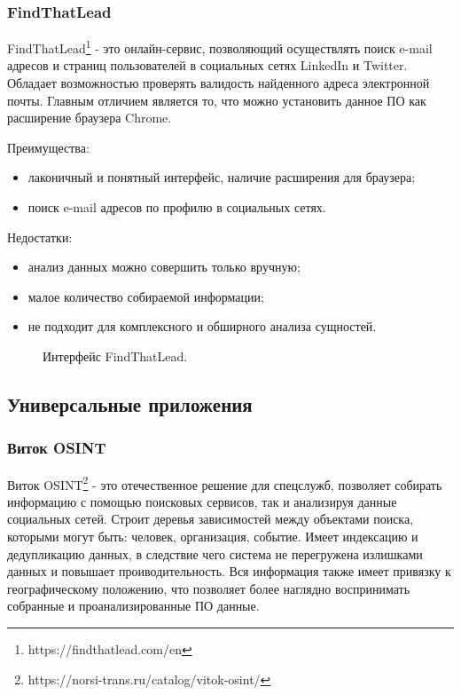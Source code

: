 \subsubsection{FindThatLead}
FindThatLead\footnote{https://findthatlead.com/en} - это онлайн-сервис, позволяющий осуществлять поиск e-mail адресов
и страниц пользователей в социальных сетях LinkedIn и Twitter. Обладает возможностью проверять валидость найденного адреса
электронной почты. Главным отличием является то, что можно установить данное ПО как расширение браузера Chrome.

Преимущества:
\begin{itemize}
    \item лаконичный и понятный интерфейс, наличие расширения для браузера;
    \item поиск e-mail адресов по профилю в социальных сетях.
\end{itemize}

Недостатки:
\begin{itemize}
    \item анализ данных можно совершить только вручную;
    \item малое количество собираемой информации;
    \item не подходит для комплексного и обширного анализа сущностей.
\end{itemize}

\begin{figure}[H]
    \caption{Интерфейс FindThatLead.}
    \label{ris:image}
\end{figure}

\subsection{Универсальные приложения}
\subsubsection{Виток OSINT}
Виток OSINT\footnote{https://norsi-trans.ru/catalog/vitok-osint/} - это отечественное решение для спецслужб, позволяет собирать
информацию с помощью поисковых сервисов, так и анализируя данные социальных сетей. Строит деревья зависимостей между объектами
поиска, которыми могут быть: человек, организация, событие. Имеет индексацию и дедупликацию данных, в следствие чего система
не перегружена излишками данных и повышает проиводительность. Вся информация также имеет привязку к географическому положению, что
позволяет более наглядно воспринимать собранные и проанализированные ПО данные.

